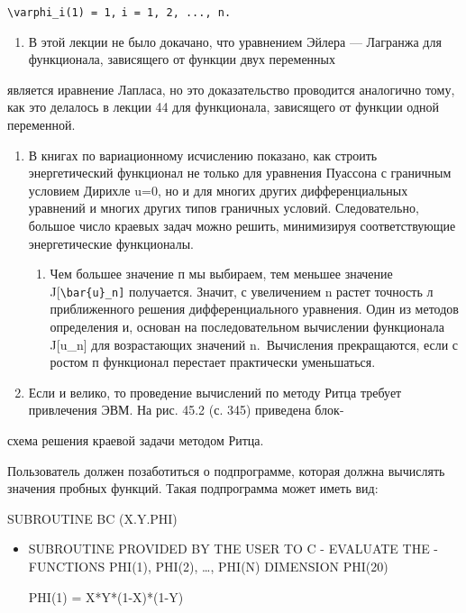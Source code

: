 \documentclass[
  ukrainian,
]{article}
\providecommand{\tightlist}{%
  \setlength{\itemsep}{0pt}\setlength{\parskip}{0pt}}
\begin{document}
\texttt{\textbackslash{}varphi\_i(1)\ =\ 1,}
\texttt{i\ =\ 1,\ 2,\ ...,\ n.}

\begin{enumerate}
\def\labelenumi{\arabic{enumi}.}
\setcounter{enumi}{1}
\tightlist
\item
  В этой лекции не было докачано, что уравнением Эйлера --- Лагранжа для
  функционала, зависящего от функции двух переменных
\end{enumerate}

является иравнение Лапласа, но это доказательство проводится аналогично
тому, как это делалось в лекции 44 для функционала, зависящего от
функции одной переменной.

\begin{enumerate}
\def\labelenumi{\arabic{enumi}.}
\setcounter{enumi}{2}
\item
  В книгах по вариационному исчислению показано, как строить
  энергетический функционал не только для уравнения Пуассона с граничным
  условием Дирихле u=0, но и для многих других дифференциальных
  уравнений и многих других типов граничных условий. Следовательно,
  большое число краевых задач можно решить, минимизируя соответствующие
  энергетические функционалы.

  \begin{enumerate}
  \def\labelenumii{\arabic{enumii}.}
  \setcounter{enumii}{3}
  \tightlist
  \item
    Чем большее значение п мы выбираем, тем меньшее значение
    J{[}\texttt{\textbackslash{}bar\{u\}\_n{]}} получается. Значит, с
    увеличением n растет точность л приближенного решения
    дифференциального уравнения. Один из методов определения и, основан
    на последовательном вычислении функционала J{[}u\_n{]} для
    возрастающих значений n.~Вычисления прекращаются, если с ростом п
    функционал перестает практически уменьшаться.
  \end{enumerate}
\item
  Если и велико, то проведение вычислений по методу Ритца требует
  привлечения ЭВМ. На рис. 45.2 (с. 345) приведена блок-
\end{enumerate}

схема решения краевой задачи методом Ритца.

Пользователь должен позаботиться о подпрограмме, которая должна
вычислять значения пробных функций. Такая подпрограмма может иметь вид:

SUBROUTINE BC (X.Y.PHI)

\begin{itemize}
\item
  SUBROUTINE PROVIDED BY THE USER TO C - EVALUATE THE - FUNCTIONS
  PHI(1), PHI(2), \ldots, PHI(N) DIMENSION PHI(20)

  PHI(1) = X*Y*(1-X)*(1-Y)
\end{itemize}
\end{document}
